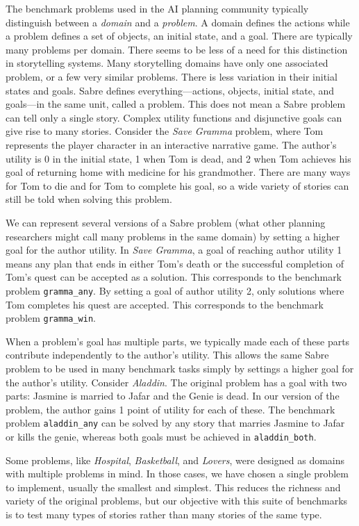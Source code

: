 \documentclass{nilreport}
\begin{document}
The benchmark problems used in the AI planning community typically
distinguish between a \emph{domain} and a \emph{problem}. A domain
defines the actions while a problem defines a set of objects, an initial
state, and a goal. There are typically many problems per domain. There
seems to be less of a need for this distinction in storytelling systems.
Many storytelling domains have only one associated problem, or a few
very similar problems. There is less variation in their initial states
and goals. Sabre defines everything---actions, objects, initial state,
and goals---in the same unit, called a problem. This does not mean
a Sabre problem can tell only a single story. Complex utility functions
and disjunctive goals can give rise to many stories. Consider the
\emph{Save Gramma} problem, where Tom represents the player character
in an interactive narrative game. The author's utility is 0 in the
initial state, 1 when Tom is dead, and 2 when Tom achieves his goal
of returning home with medicine for his grandmother. There are many
ways for Tom to die and for Tom to complete his goal, so a wide variety
of stories can still be told when solving this problem.

We can represent several versions of a Sabre problem (what other planning
researchers might call many problems in the same domain) by setting
a higher goal for the author utility. In \emph{Save Gramma}, a goal
of reaching author utility 1 means any plan that ends in either Tom's
death or the successful completion of Tom's quest can be accepted
as a solution. This corresponds to the benchmark problem \texttt{gramma\_any}.
By setting a goal of author utility 2, only solutions where Tom completes
his quest are accepted. This corresponds to the benchmark problem
\texttt{gramma\_win}.

When a problem's goal has multiple parts, we typically made each of
these parts contribute independently to the author's utility. This
allows the same Sabre problem to be used in many benchmark tasks simply
by settings a higher goal for the author's utility. Consider \emph{Aladdin}.
The original problem has a goal with two parts: Jasmine is married
to Jafar and the Genie is dead. In our version of the problem, the
author gains 1 point of utility for each of these. The benchmark problem
\texttt{aladdin\_any} can be solved by any story that marries Jasmine
to Jafar or kills the genie, whereas both goals must be achieved in
\texttt{aladdin\_both}.

Some problems, like \emph{Hospital}, \emph{Basketball}, and \emph{Lovers},
were designed as domains with multiple problems in mind. In those
cases, we have chosen a single problem to implement, usually the smallest
and simplest. This reduces the richness and variety of the original
problems, but our objective with this suite of benchmarks is to test
many types of stories rather than many stories of the same type.
\end{document}
